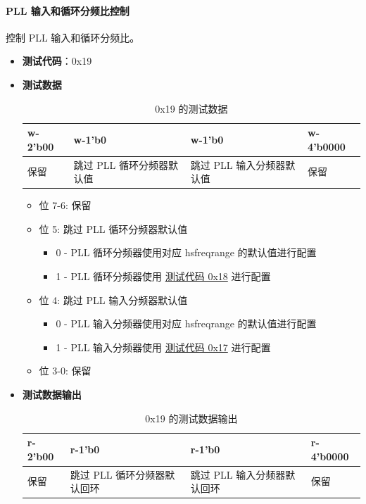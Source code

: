 \documentclass[main\_\_CN.tex]{subfiles}
\begin{document}
\paragraph{PLL 输入和循环分频比控制}
\label{sec:test-code-0x19}
控制 PLL 输入和循环分频比。

\begin{itemize}
    \item \textbf{测试代码}：0x19
    \item \textbf{测试数据}
        \begin{longtable}{ |p{2cm}|p{5cm}|p{5cm}|p{2cm}|}
            \caption{0x19 的测试数据}
            \label{tab:test-data-0x19} \\
            \hline
            \rowcolor{lightgray}
            \textbf{w-2'b00} & \textbf{w-1'b0} & \textbf{w-1'b0} & \textbf{w-4'b0000} \\ \hline
            保留 & 跳过 PLL 循环分频器默认值 & 跳过 PLL 输入分频器默认值 & 保留 \\ \hline
        \end{longtable}
        \begin{itemize}
            \item 位 7-6: 保留
            \item 位 5: 跳过 PLL 循环分频器默认值
                \begin{itemize}
                    \item 0 - PLL 循环分频器使用对应 hsfreqrange 的默认值进行配置
                    \item 1 - PLL 循环分频器使用 \hyperref[sec:test-code-0x18]{测试代码 0x18} 进行配置
                \end{itemize}
            \item 位 4: 跳过 PLL 输入分频器默认值
                \begin{itemize}
                    \item 0 - PLL 输入分频器使用对应 hsfreqrange 的默认值进行配置
                    \item 1 - PLL 输入分频器使用 \hyperref[sec:test-code-0x17]{测试代码 0x17} 进行配置
                \end{itemize}
            \item 位 3-0: 保留
        \end{itemize}
    \item \textbf{测试数据输出}
        \begin{longtable}{ |p{2cm}|p{5cm}|p{5cm}|p{2cm}|}
            \caption{0x19 的测试数据输出}
            \label{tab:test-dout-0x19} \\
            \hline
            \rowcolor{lightgray}
            \textbf{r-2'b00} & \textbf{r-1'b0} & \textbf{r-1'b0} & \textbf{r-4'b0000} \\ \hline
            保留 & 跳过 PLL 循环分频器默认回环 & 跳过 PLL 输入分频器默认回环 & 保留 \\ \hline
        \end{longtable}
\end{itemize}
\end{document}
